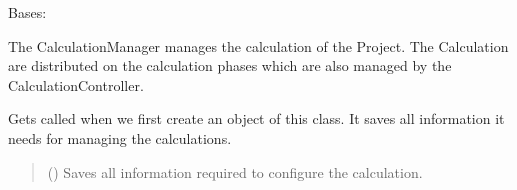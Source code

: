 \documentclass[letterpaper,10pt,english]{sphinxmanual}
\begin{document}
\begin{fulllineitems}
\label{\detokenize{apidoc/src.osm_configurator.model.project.calculation:src.osm_configurator.model.project.calculation.calculation_manager.CalculationManager}}
\pysigstartsignatures
{}
\pysigstopsignatures
\sphinxAtStartPar
Bases: 

\sphinxAtStartPar
The CalculationManager manages the calculation of the Project. The Calculation are distributed on the calculation
phases which are also managed by the CalculationController.

\begin{fulllineitems}
\label{\detokenize{apidoc/src.osm_configurator.model.project.calculation:src.osm_configurator.model.project.calculation.calculation_manager.CalculationManager.__init__}}
\pysigstartsignatures
{}
\pysigstopsignatures
\sphinxAtStartPar
Gets called when we first create an object of this class. It saves all information it needs for
managing the calculations.
\begin{quote}\begin{description}
\sphinxAtStartPar
{} ({\hyperref[\detokenize{apidoc/src.osm_configurator.model.project.configuration:src.osm_configurator.model.project.configuration.configuration_manager.ConfigurationManager}]{}}) \textendash{} Saves all information required to configure the calculation.

\end{description}\end{quote}

\end{fulllineitems}



\end{fulllineitems}
\end{document}
